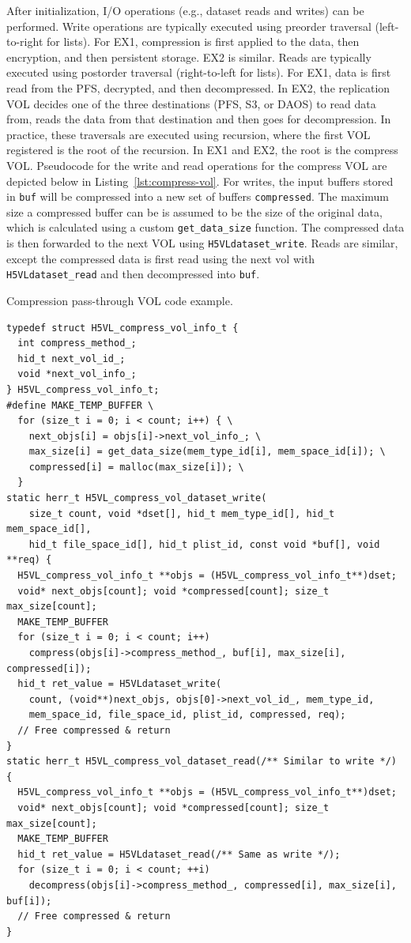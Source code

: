 After initialization, I/O operations (e.g., dataset reads and writes) can be performed. Write operations are typically executed using preorder traversal (left-to-right for lists). For EX1, compression is first applied to the data, then encryption, and then persistent storage. EX2 is similar. Reads are typically executed using postorder traversal (right-to-left for lists). For EX1, data is first read from the PFS, decrypted, and then decompressed. In EX2, the replication VOL decides one of the three destinations (PFS, S3, or DAOS) to read data from, reads the data from that destination and then goes for decompression. In practice, these traversals are executed using recursion, where the first VOL registered is the root of the recursion. In EX1 and EX2, the root is the compress VOL. Pseudocode for the write and read operations for the compress VOL are depicted below in Listing~\ref{lst:compress-vol}. For writes, the input buffers stored in \texttt{buf} will be compressed into a new set of buffers \texttt{compressed}. The maximum size a compressed buffer can be is assumed to be the size of the original data, which is calculated using a custom \texttt{get\_data\_size} function. The compressed data is then forwarded to the next VOL using \texttt{H5VLdataset\_write}. Reads are similar, except the compressed data is first read using the next vol with \texttt{H5VLdataset\_read} and then decompressed into \texttt{buf}.

\begin{listing}[!ht]
\centering
\caption{Compression pass-through VOL code example.}
\label{lst:compress-vol}
\begin{verbatim}
typedef struct H5VL_compress_vol_info_t {
  int compress_method_;
  hid_t next_vol_id_;
  void *next_vol_info_;
} H5VL_compress_vol_info_t;
#define MAKE_TEMP_BUFFER \
  for (size_t i = 0; i < count; i++) { \
    next_objs[i] = objs[i]->next_vol_info_; \
    max_size[i] = get_data_size(mem_type_id[i], mem_space_id[i]); \
    compressed[i] = malloc(max_size[i]); \
  }
static herr_t H5VL_compress_vol_dataset_write(
    size_t count, void *dset[], hid_t mem_type_id[], hid_t mem_space_id[],
    hid_t file_space_id[], hid_t plist_id, const void *buf[], void **req) {
  H5VL_compress_vol_info_t **objs = (H5VL_compress_vol_info_t**)dset;
  void* next_objs[count]; void *compressed[count]; size_t max_size[count];
  MAKE_TEMP_BUFFER
  for (size_t i = 0; i < count; i++)
    compress(objs[i]->compress_method_, buf[i], max_size[i], compressed[i]);
  hid_t ret_value = H5VLdataset_write(
    count, (void**)next_objs, objs[0]->next_vol_id_, mem_type_id, 
    mem_space_id, file_space_id, plist_id, compressed, req);
  // Free compressed & return
}
static herr_t H5VL_compress_vol_dataset_read(/** Similar to write */) {
  H5VL_compress_vol_info_t **objs = (H5VL_compress_vol_info_t**)dset;
  void* next_objs[count]; void *compressed[count]; size_t max_size[count];
  MAKE_TEMP_BUFFER
  hid_t ret_value = H5VLdataset_read(/** Same as write */);
  for (size_t i = 0; i < count; ++i)
    decompress(objs[i]->compress_method_, compressed[i], max_size[i], buf[i]);
  // Free compressed & return
}
\end{verbatim}
\end{listing}


